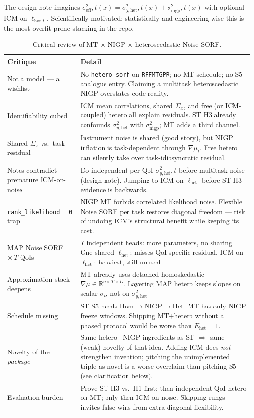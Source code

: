 \documentclass[11pt]{article}
\newcommand{\sighet}{\sigma_{y,\mathrm{het}}^{2}}
\newcommand{\signigp}{\sigma_{\mathrm{nigp}}^{2}}
\newcommand{\sigeff}{\sigma_{\mathrm{eff}}^{2}}
\newcommand{\Sigx}{\Sigma_{x}}
\begin{document}
The design note imagines
$\sigeff,t(x)=\sighet,t(x)+\signigp,t(x)$
with optional ICM on $\ell_{\mathrm{het},t}$.
Scientifically motivated; statistically and engineering-wise this is the most
overfit-prone stacking in the repo.

\begin{table}[H]
\centering
\small
\begin{tabular}{@{}>{\raggedright\arraybackslash}p{3.2cm}
  >{\raggedright\arraybackslash}p{9.4cm}@{}}
\toprule
\textbf{Critique} & \textbf{Detail} \\
\midrule
Not a model --- a wishlist
& No \texttt{hetero\_sorf} on \texttt{RFFMTGPR}; no MT schedule; no S5-analogue entry.
Claiming a multitask heteroscedastic NIGP overstates code reality. \\
Identifiability cubed
& ICM mean correlations, shared $\Sigx$, and free (or ICM-coupled) hetero all
explain residuals. ST H3 already confounds $\sighet$ with $\signigp$; MT adds a
third channel. \\
Shared $\Sigx$ vs.\ task residual
& Instrument noise is shared (good story), but NIGP inflation is
task-dependent through $\nabla\mu_{t}$. Free hetero can silently take over
task-idiosyncratic residual. \\
Notes contradict premature ICM-on-noise
& Do independent per-QoI $\sighet,t$ before multitask noise (design note).
Jumping to ICM on $\ell_{\mathrm{het}}$ before ST H3 evidence is backwards. \\
\texttt{rank\_likelihood$=$0} trap
& NIGP MT forbids correlated likelihood noise. Flexible Noise SORF per task
restores diagonal freedom --- risk of undoing ICM's structural benefit while
keeping its cost. \\
MAP Noise SORF $\times\,T$ QoIs
& $T$ independent heads: more parameters, no sharing.
One shared $\ell_{\mathrm{het}}$: misses QoI-specific residual.
ICM on $\ell_{\mathrm{het}}$: heaviest, still unused. \\
Approximation stack deepens
& MT already uses detached homoskedastic $\nabla\mu\in\mathbb{R}^{n\times T\times D}$.
Layering MAP hetero keeps slopes on scalar $\sigma_{t}$, not on $\sighet$. \\
Schedule missing
& ST S5 needs Hom$\to$NIGP$\to$Het. MT has only NIGP freeze windows.
Shipping MT$+$hetero without a phased protocol would be worse than
$E_{\mathrm{het}}=1$. \\
Novelty of the \emph{package}
& Same hetero$+$NIGP ingredients as ST $\Rightarrow$ same (weak) novelty of that
idea. Adding ICM does \emph{not} strengthen invention; pitching the
unimplemented triple as novel is a worse overclaim than pitching S5
(see clarification below). \\
Evaluation burden
& Prove ST H3 vs.\ H1 first; then independent-QoI hetero on MT; only then
ICM-on-noise. Skipping rungs invites false wins from extra diagonal flexibility. \\
\bottomrule
\end{tabular}
\caption{Critical review of MT $\times$ NIGP $\times$ heteroscedastic Noise SORF.}
\label{tab:mt-critique}
\end{table}
\end{document}
